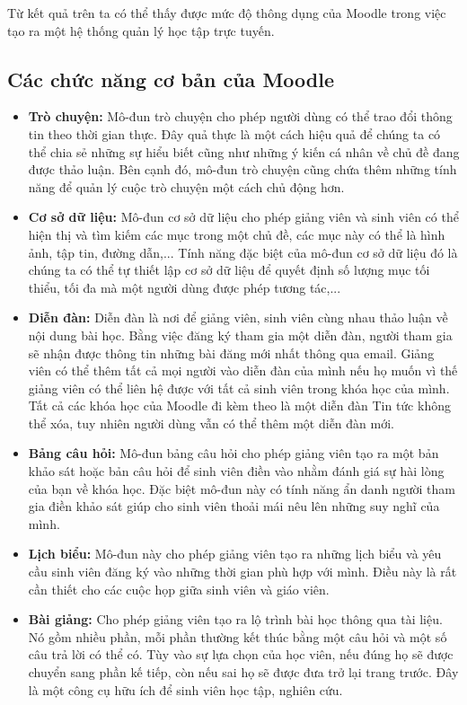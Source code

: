 Từ kết quả trên ta có thể thấy được mức độ thông dụng của Moodle trong việc tạo ra một hệ thống quản lý học tập trực tuyến.
\subsection{Các chức năng cơ bản của Moodle \cite{featuremoodle}}
\begin{itemize}
	\item {\bf Trò chuyện:} Mô-đun trò chuyện cho phép người dùng có thể trao đổi thông tin theo thời gian thực. Đây quả thực là một cách hiệu quả để chúng ta có thể chia sẻ những sự hiểu biết cũng như những ý kiến cá nhân về chủ đề đang được thảo luận. Bên cạnh đó, mô-đun trò chuyện cũng chứa thêm những tính năng để quản lý cuộc trò chuyện một cách chủ động hơn.
	\item {\bf Cơ sở dữ liệu:} Mô-đun cơ sở dữ liệu cho phép giảng viên và sinh viên có thể hiện thị và tìm kiếm các mục trong một chủ đề, các mục này có thể là hình ảnh, tập tin, đường dẫn,... Tính năng đặc biệt của mô-đun cơ sở dữ liệu đó là chúng ta có thể tự thiết lập cơ sở dữ liệu để quyết định số lượng mục tối thiểu, tối đa mà một người dùng được phép tương tác,...
	\item {\bf Diễn đàn:} Diễn đàn là nơi để giảng viên, sinh viên cùng nhau thảo luận về nội dung bài học. Bằng việc đăng ký tham gia một diễn đàn, người tham gia sẽ nhận được thông tin những bài đăng mới nhất thông qua email. Giảng viên có thể thêm tất cả mọi người vào diễn đàn của mình nếu họ muốn vì thế giảng viên có thể liên hệ được với tất cả sinh viên trong khóa học của mình. Tất cả các khóa học của Moodle đi kèm theo là một diễn đàn Tin tức không thể xóa, tuy nhiên người dùng vẫn có thể thêm một diễn đàn mới.
	\item {\bf Bảng câu hỏi:} Mô-đun bảng câu hỏi cho phép giảng viên tạo ra một bản khảo sát hoặc bản câu hỏi để sinh viên điền vào nhằm đánh giá sự hài lòng của bạn về khóa học. Đặc biệt mô-đun này có tính năng ẩn danh người tham gia điền khảo sát giúp cho sinh viên thoải mái nêu lên những suy nghĩ của mình.
	\item {\bf Lịch biểu:} Mô-đun này cho phép giảng viên tạo ra những lịch biểu và yêu cầu sinh viên đăng ký vào những thời gian phù hợp với mình. Điều này là rất cần thiết cho các cuộc họp giữa sinh viên và giáo viên.
	\item {\bf Bài giảng:} Cho phép giảng viên tạo ra lộ trình bài học thông qua tài liệu. Nó gồm nhiều phần, mỗi phần thường kết thúc bằng một câu hỏi và một số câu trả lời có thể có. Tùy vào sự lựa chọn của học viên, nếu đúng họ sẽ được chuyển sang phần kế tiếp, còn nếu sai họ sẽ được đưa trở lại trang trước. Đây là một công cụ hữu ích để sinh viên học tập, nghiên cứu.

\end{itemize}
